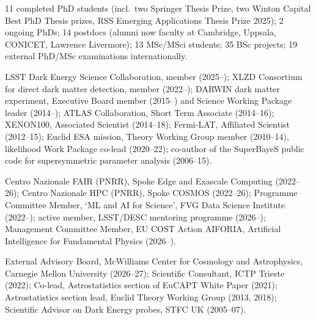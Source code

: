 11 completed PhD students (incl.\  two Springer Thesis Prize, two Winton Capital Best PhD Thesis prizes, RSS Emerging Applications Thesis Prize 2025); 2 ongoing PhDs; 14 postdocs (alumni now faculty at Cambridge, Uppsala, CONICET, Lawrence Livermore); 13 MSc/MSci students; 35 BSc projects; 19 external PhD/MSc examinations internationally.



LSST Dark Energy Science Collaboration, member (2025–); XLZD Consortium for direct dark matter detection, member (2022–); DARWIN dark matter experiment, Executive Board member (2015–) and Science Working Package leader (2014–); ATLAS Collaboration, Short Term Associate (2014–16); XENON100, Associated Scientist (2014–18); Fermi-LAT, Affiliated Scientist (2012–15); Euclid ESA mission, Theory Working Group member (2010–14), likelihood Work Package co-lead (2020–22); co-author of the {\ttfamily SuperBayeS} public code for supersymmetric parameter analysis (2006–15).

Centro Nazionale FAIR (PNRR), Spoke Edge and Exascale Computing (2022–26); Centro Nazionale HPC (PNRR), Spoke COSMOS (2022–26); Programme Committee Member, `ML and AI for Science', FVG Data Science Institute (2022–); active member, LSST/DESC mentoring programme (2026–); Management Committee Member, EU COST Action AIFORIA, Artificial Intelligence for Fundamental Physics (2026–).

External Advisory Board, McWilliams Center for Cosmology and Astrophysics, Carnegie Mellon University (2026–27); Scientific Consultant, ICTP Trieste (2022); Co-lead, Astrostatistics section of EuCAPT White Paper (2021); Astrostatistics section lead, Euclid Theory Working Group (2013, 2018); Scientific Advisor on Dark Energy probes, STFC UK (2005–07).




